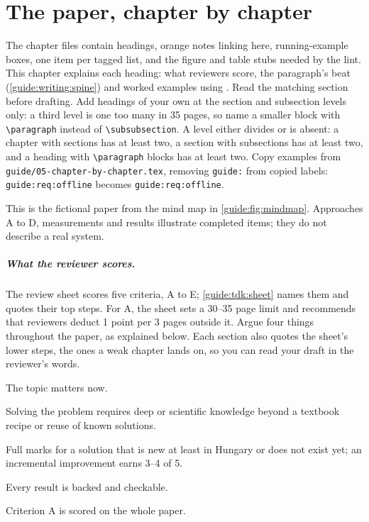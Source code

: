 \chapter{The paper, chapter by chapter}\label{guide:chapters}
The chapter files contain headings, orange notes linking here, running-example boxes, one item per tagged list, and the figure and table stubs needed by the lint. This chapter explains each heading: what reviewers score, the paragraph's beat (\cref{guide:writing:spine}) and worked examples using \exname. Read the matching section before drafting. Add headings of your own at the section and subsection levels only: a third level is one too many in 35 pages, so name a smaller block with \texttt{\textbackslash paragraph} instead of \texttt{\textbackslash subsubsection}. A level either divides or is absent: a chapter with sections has at least two, a section with subsections has at least two, and a heading with \texttt{\textbackslash paragraph} blocks has at least two. Copy examples from \texttt{guide/05-chapter-by-chapter.tex}, removing \texttt{guide:} from copied labels: \texttt{guide:req:offline} becomes \texttt{guide:req:offline}.

This is the fictional paper from the mind map in \cref{guide:fig:mindmap}. Approaches A to D, measurements and results illustrate completed items; they do not describe a real system.

\paragraph{What the reviewer scores.} The review sheet scores five criteria, A to E; \cref{guide:tdk:sheet} names them and quotes their top steps. For A, the sheet sets a 30--35 page limit and recommends that reviewers deduct 1 point per 3 pages outside it. Argue four things throughout the paper, as explained below. Each section also quotes the sheet's lower steps, the ones a weak chapter lands on, so you can read your draft in the reviewer's words.
\begin{description}[noitemsep]
  \item[Relevance (C)] The topic matters now.
  \item[Non-triviality (C and D/1)] Solving the problem requires deep or scientific knowledge beyond a textbook recipe or reuse of known solutions.
  \item[Novelty (D/1)] Full marks for a solution that is new at least in Hungary or does not exist yet; an incremental improvement earns 3--4 of 5.
  \item[Correctness (D/2)] Every result is backed and checkable.
\end{description}
Criterion A is scored on the whole paper.

